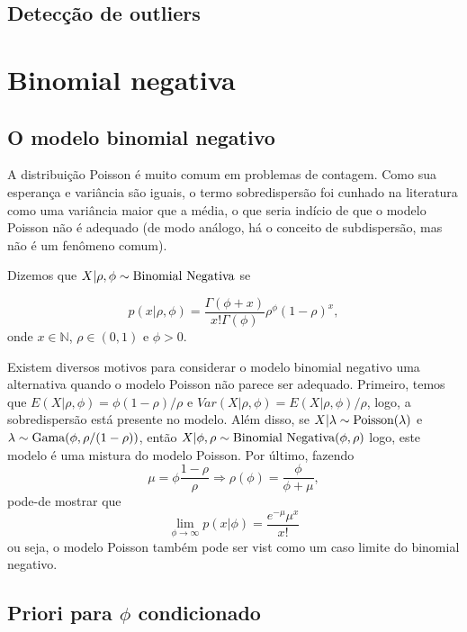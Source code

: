 \documentclass[
  letterpaper,
  DIV=11,
  numbers=noendperiod]{scrreprt}
\theoremstyle{definition}
\theoremstyle{definition}
\theoremstyle{plain}
\theoremstyle{remark}
\begin{document}
\section{Detecção de outliers}\label{detecuxe7uxe3o-de-outliers}


\chapter{Binomial negativa}\label{binomial-negativa}

\section{O modelo binomial negativo}\label{o-modelo-binomial-negativo}

A distribuição Poisson é muito comum em problemas de contagem. Como sua
esperança e variância são iguais, o termo sobredispersão foi cunhado na
literatura como uma variância maior que a média, o que seria indício de
que o modelo Poisson não é adequado (de modo análogo, há o conceito de
subdispersão, mas não é um fenômeno comum).

Dizemos que \(X|\rho,\phi\sim\hbox{Binomial Negativa}\) se

\[p(x|\rho,\phi)=\frac{\Gamma(\phi+x)}{x!\Gamma(\phi)}\rho^\phi(1-\rho)^x,\]
onde \(x\in\mathbb{N}\), \(\rho\in(0,1)\) e \(\phi>0\).

Existem diversos motivos para considerar o modelo binomial negativo uma
alternativa quando o modelo Poisson não parece ser adequado. Primeiro,
temos que \(E(X|\rho,\phi)=\phi(1-\rho)/\rho\) e
\(Var(X|\rho,\phi)=E(X|\rho,\phi)/\rho\), logo, a sobredispersão está
presente no modelo. Além disso, se
\(X|\lambda\sim\hbox{Poisson}(\lambda)\) e
\(\lambda\sim\hbox{Gama}(\phi, \rho/(1-\rho))\), então
\(X|\phi,\rho\sim\hbox{Binomial Negativa}(\phi,\rho)\) logo, este modelo
é uma mistura do modelo Poisson. Por último, fazendo
\[\mu=\phi\frac{1-\rho}{\rho}\Rightarrow \rho(\phi)=\frac{\phi}{\phi+\mu},\]
pode-de mostrar que
\[\lim_{\phi\rightarrow\infty}p(x|\phi)=\frac{e^{-\mu}\mu^x}{x!}\] ou
seja, o modelo Poisson também pode ser vist como um caso limite do
binomial negativo.

\section{\texorpdfstring{Priori para \(\phi\)
condicionado}{Priori para \textbackslash phi condicionado}}\label{priori-para-phi-condicionado}
\end{document}
